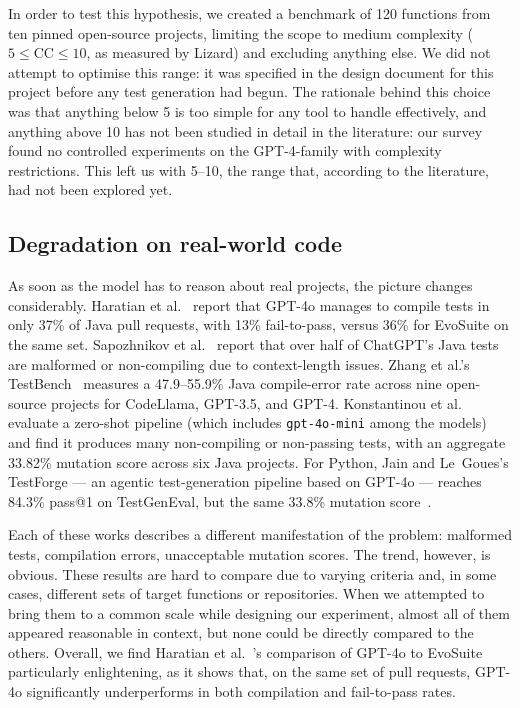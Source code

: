 In order to test this hypothesis, we created a benchmark of 120 functions from ten pinned
open-source projects, limiting the scope to medium complexity ($5 \le \mathrm{CC} \le 10$,
as measured by Lizard) and excluding anything else. We did not attempt to optimise this
range: it was specified in the design document for this project before any test
generation had begun. The rationale behind this choice was that anything below 5 is too
simple for any tool to handle effectively, and anything above 10 has not been studied in
detail in the literature: our survey found no controlled experiments on the GPT-4-family
with complexity restrictions. This left us with 5--10, the range that, according to the
literature, had not been explored yet.

\subsection{Degradation on real-world code}\label{sec:rel-real}
As soon as the model has to reason about real projects, the picture changes considerably.
Haratian et al.~\cite{haratian2026praware} report that GPT-4o manages to compile tests in
only 37\% of Java pull requests, with 13\% fail-to-pass, versus 36\% for EvoSuite on the
same set. Sapozhnikov et al.~\cite{sapozhnikov2024empirical} report that over half of
ChatGPT's Java tests are malformed or non-compiling due to context-length issues. Zhang
et al.'s TestBench~\cite{zhang2024testbench} measures a 47.9--55.9\% Java compile-error
rate across nine open-source projects for CodeLlama, GPT-3.5, and GPT-4. Konstantinou
et al.~\cite{konstantinou2026evaluating} evaluate a zero-shot pipeline (which includes
\texttt{gpt-4o-mini} among the models) and find it produces many non-compiling or
non-passing tests, with an aggregate 33.82\% mutation score across six Java projects. For
Python, Jain and Le~Goues's TestForge --- an agentic test-generation pipeline based on
GPT-4o --- reaches 84.3\% pass@1 on TestGenEval, but the same 33.8\% mutation
score~\cite{jain2025testgeneval}.

Each of these works describes a different manifestation of the problem: malformed tests,
compilation errors, unacceptable mutation scores. The trend, however, is obvious. These
results are hard to compare due to varying criteria and, in some cases, different sets of
target functions or repositories. When we attempted to bring them to a common scale while
designing our experiment, almost all of them appeared reasonable in context, but none
could be directly compared to the others. Overall, we find Haratian
et al.~\cite{haratian2026praware}'s comparison of GPT-4o to EvoSuite particularly
enlightening, as it shows that, on the same set of pull requests, GPT-4o significantly
underperforms in both compilation and fail-to-pass rates.

